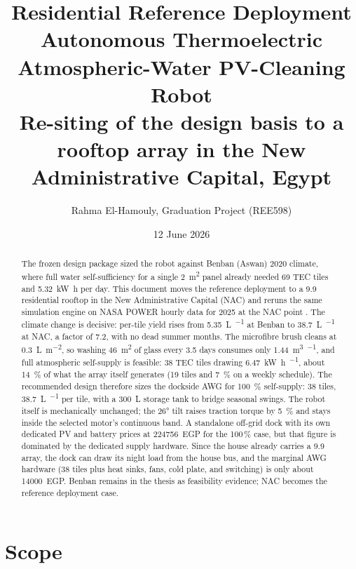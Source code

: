 \documentclass[11pt,a4paper]{article}
\title{\textbf{Residential Reference Deployment}\\[0.4em]
\large Autonomous Thermoelectric Atmospheric-Water PV-Cleaning Robot\\[0.2em]
\normalsize Re-siting of the design basis to a rooftop array in the
New Administrative Capital, Egypt}
\author{Rahma El-Hamouly, Graduation Project (REE598)}
\date{12 June 2026}
\begin{document}
\maketitle

\begin{abstract}
\noindent
The frozen design package sized the robot against Benban (Aswan) 2020
climate, where full water self-sufficiency for a single \SI{2}{\metre\squared}
panel already needed 69 TEC tiles and \SI{5.32}{\kilo\watt\hour} per day.
This document moves the reference deployment to a \SI{9.9}{\kWp} residential
rooftop in the New Administrative Capital (NAC) and reruns the same
simulation engine on NASA POWER hourly data for 2025 at the NAC point
\cite{nasa_power_nac2025}. The climate change is decisive: per-tile yield
rises from \SI{5.35}{\liter\per\yr} at Benban to \SI{38.7}{\liter\per\yr}
at NAC, a factor of 7.2, with no dead summer months. The microfibre brush
cleans at \SI{0.3}{\liter\per\metre\squared}, so washing
\SI{46}{\metre\squared} of glass every \num{3.5} days consumes only
\SI{1.44}{\cubic\metre\per\yr}, and full atmospheric self-supply is feasible:
38 TEC tiles drawing \SI{6.47}{\kilo\watt\hour\per\dy}, about
\SI{14}{\percent} of what the array itself generates (19 tiles and
\SI{7}{\percent} on a weekly schedule). The recommended design therefore
sizes the dockside AWG for \SI{100}{\percent} self-supply: 38 tiles,
\SI{38.7}{\liter\per\yr} per tile, with a \SI{300}{\liter} storage tank to
bridge seasonal swings.
The robot itself is mechanically unchanged; the \ang{26} tilt raises
traction torque by \SI{5}{\percent} and stays inside the selected motor's
continuous band. A standalone off-grid dock with its own dedicated PV and
battery prices at \num{224756}~EGP for the 100\,\% case, but that figure is
dominated by the dedicated supply hardware. Since the house already carries
a \SI{9.9}{\kWp} array, the dock can draw its night load from the house bus,
and the marginal AWG hardware (38 tiles plus heat sinks, fans, cold plate,
and switching) is only about \num{14000}~EGP. Benban remains in the thesis
as feasibility evidence; NAC becomes the reference deployment case.
\end{abstract}

\section{Scope}
\end{document}
